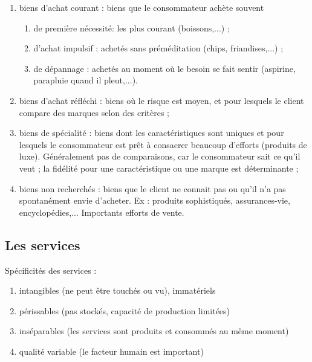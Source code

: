 		\begin{enumerate}
			\item biens d'achat courant : biens que le consommateur achète souvent
	
			\begin{enumerate}
				\item de première nécessité: les plus courant (boissons,...) ;
				\item d'achat impulsif : achetés sans préméditation (chips, friandises,...) ;
				\item de dépannage : achetés au moment où le besoin se fait sentir (aspirine, parapluie quand il pleut,...).
			\end{enumerate}
			
			\item biens d'achat réfléchi : biens où le risque est moyen, et pour lesquels le client compare des marques selon des critères ;
			
			\item biens de spécialité : biens dont les caractéristiques sont uniques et pour lesquels le consommateur est prêt à consacrer beaucoup d'efforts (produits de luxe). Généralement pas de comparaisons, car le consommateur sait ce qu'il veut ; la fidélité pour une caractéristique ou une marque est déterminante ;
			
			\item biens non recherchés : biens que le client ne connait pas ou qu'il n'a pas spontanément envie d'acheter. Ex : produits sophistiqués, assurances-vie, encyclopédies,... Importants efforts de vente.
		\end{enumerate}


		\subsection{Les services}
		
		Spécificités des services :

		\begin{enumerate}
			\item intangibles (ne peut être touchés ou vu), immatériels
			\item périssables (pas stockés, capacité de production limitées)
			\item inséparables (les services sont produits et consommés au même moment)
			\item qualité variable (le facteur humain est important)
		\end{enumerate}


